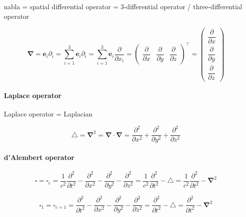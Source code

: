 \documentclass[
]{book}
\theoremstyle{definition}
\theoremstyle{definition}
\theoremstyle{definition}
\theoremstyle{definition}
\theoremstyle{remark}
\begin{document}
nabla = spatial differential operator = 3-differential operator / three-differential operator

\[
\boldsymbol{\nabla}=\boldsymbol{e}_{{\scriptscriptstyle i}}\partial_{{\scriptscriptstyle i}}=\sum_{i=1}^{3}\boldsymbol{e}_{{\scriptscriptstyle i}}\partial_{{\scriptscriptstyle i}}=\sum_{i=1}^{3}\boldsymbol{e}_{{\scriptscriptstyle i}}\dfrac{\partial}{\partial x_{{\scriptscriptstyle i}}}=\begin{pmatrix}\dfrac{\partial}{\partial x} & \dfrac{\partial}{\partial y} & \dfrac{\partial}{\partial z}\end{pmatrix}^{\intercal}=\begin{pmatrix}\dfrac{\partial}{\partial x}\\
\dfrac{\partial}{\partial y}\\
\dfrac{\partial}{\partial z}
\end{pmatrix}
\]

\hypertarget{laplace-operator}{%
\paragraph{Laplace operator}\label{laplace-operator}}

Laplace operator = Laplacian

\[
\triangle=\boldsymbol{\nabla}^{2}=\boldsymbol{\nabla}\cdot\boldsymbol{\nabla}=\dfrac{\partial^{2}}{\partial x^{2}}+\dfrac{\partial^{2}}{\partial y^{2}}+\dfrac{\partial^{2}}{\partial z^{2}}
\]

\hypertarget{dalembert-operator}{%
\paragraph{d'Alembert operator}\label{dalembert-operator}}

\[
\square=\square_{{\scriptscriptstyle c}}=\dfrac{1}{c^{2}}\dfrac{\partial^{2}}{\partial t^{2}}-\dfrac{\partial^{2}}{\partial x^{2}}-\dfrac{\partial^{2}}{\partial y^{2}}-\dfrac{\partial^{2}}{\partial z^{2}}=\dfrac{1}{c^{2}}\dfrac{\partial^{2}}{\partial t^{2}}-\triangle=\dfrac{1}{c^{2}}\dfrac{\partial^{2}}{\partial t^{2}}-\boldsymbol{\nabla}^{2}
\]

\[
\square_{{\scriptscriptstyle 1}}=\square_{{\scriptscriptstyle c=1}}=\dfrac{\partial^{2}}{\partial t^{2}}-\dfrac{\partial^{2}}{\partial x^{2}}-\dfrac{\partial^{2}}{\partial y^{2}}-\dfrac{\partial^{2}}{\partial z^{2}}=\dfrac{\partial^{2}}{\partial t^{2}}-\triangle=\dfrac{\partial^{2}}{\partial t^{2}}-\boldsymbol{\nabla}^{2}
\]
\end{document}
